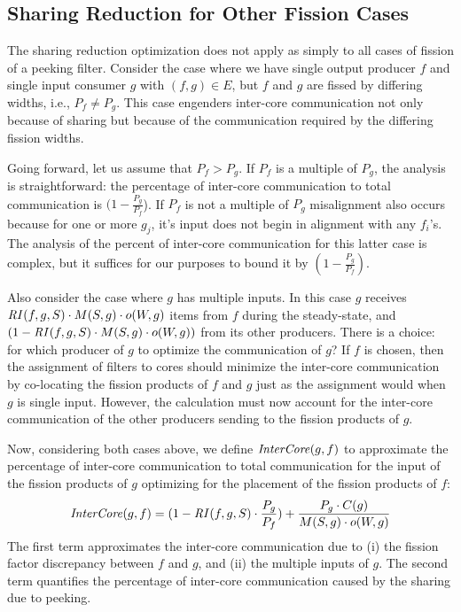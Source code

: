 \subsection{Sharing Reduction for Other Fission Cases}

The sharing reduction optimization does not apply as simply to all
cases of fission of a peeking filter.  Consider the case where we have
single output producer $f$ and single input consumer $g$ with $(f,g)
\in E$, but $f$ and $g$ are fissed by differing widths, i.e., $P_f \ne
P_g$.  This case engenders inter-core communication not only because
of sharing but because of the communication required by the differing
fission widths.  

Going forward, let us assume that $P_f > P_g$.  If $P_f$ is a multiple
of $P_g$, the analysis is straightforward: the percentage of
inter-core communication to total communication is $(1 -
\frac{P_g}{P_f}$). If $P_f$ is not a multiple of $P_g$ misalignment
also occurs because for one or more $g_j$, it's input does not begin
in alignment with any $f_i$'s.  The analysis of the percent of
inter-core communication for this latter case is complex, but it
suffices for our purposes to bound it by $(1 - \frac{P_g}{P_f})$.

Also consider the case where $g$ has multiple inputs. In this case $g$
receives $\relax{\it RI}(f, g, S) \cdot M(S, g) \cdot o(W,g)$ items from $f$
during the steady-state, and $(1 -\relax{\it RI}(f, g, S) \cdot M(S, g) \cdot
o(W,g))$ from its other producers. There is a choice: for which
producer of $g$ to optimize the communication of $g$? If $f$ is
chosen, then the assignment of filters to cores should minimize the
inter-core communication by co-locating the fission products of $f$
and $g$ just as the assignment would when $g$ is single input.
However, the calculation must now account for the inter-core
communication of the other producers sending to the fission products
of $g$. 

Now, considering both cases above, we define $\relax{\it InterCore}(g, f)$ to
approximate the percentage of inter-core communication to total
communication for the input of the fission products of $g$ optimizing
for the placement of the fission products of $f$:
{\ninepoint
\begin{equation}
\label{eq:tcomm-fopt}
 \mt{InterCore}(g, f)   =  (1 -\mt{RI}(f,g, S) \cdot \frac{P_g}{P_f})
 + \frac{P_g \cdot C(g)}{M(S, g) \cdot o(W, g)}
\end{equation}
}
\noindent The first term approximates the inter-core communication due
to (i) the fission factor discrepancy between $f$ and $g$, and (ii) the
multiple inputs of $g$.  The second term quantifies the percentage of
inter-core communication caused by the sharing due to peeking.

